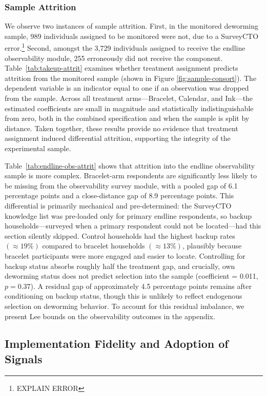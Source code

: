 \documentclass[12pt,a4paper]{article}
\begin{document}
\subsubsection{Sample Attrition}
\label{sec:sample-attrit}
We observe two instances of sample attrition. First, in the monitored deworming sample, 989 individuals assigned to be monitored were not, due to a SurveyCTO error.\footnote{EXPLAIN ERROR} Second, amongst the 3,729 individuals assigned to receive the endline observability module, 255 erroneously did not receive the component. Table~\ref{tab:takeup-attrit} examines whether treatment assignment predicts attrition from the monitored sample (shown in Figure \ref{fig:sample-consort}). The dependent variable is an indicator equal to one if an observation was dropped from the sample. Across all treatment arms---Bracelet, Calendar, and Ink---the estimated coefficients are small in magnitude and statistically indistinguishable from zero, both in the combined specification and when the sample is split by distance. Taken together, these results provide no evidence that treatment assignment induced differential attrition, supporting the integrity of the experimental sample.

Table~\ref{tab:endline-obs-attrit} shows that attrition into the endline observability sample is more complex. Bracelet-arm respondents are significantly less likely to be missing from the observability survey module, with a pooled gap of 6.1 percentage points and a close-distance gap of 8.9 percentage points. This differential is primarily mechanical and pre-determined: the SurveyCTO knowledge list was pre-loaded only for primary endline respondents, so backup households---surveyed when a primary respondent could not be located---had this section silently skipped. Control households had the highest backup rates $(\approx19\%)$ compared to bracelet households $(\approx13\%)$, plausibly because bracelet participants were more engaged and easier to locate. Controlling for backup status absorbs roughly half the treatment gap, and crucially, own deworming status does not predict selection into the sample (coefficient = 0.011, $p = 0.37$). A residual gap of approximately 4.5 percentage points remains after conditioning on backup status, though this is unlikely to reflect endogenous selection on deworming behavior. To account for this residual imbalance, we present Lee bounds on the observability outcomes in the appendix.

\subsection{Implementation Fidelity and Adoption of Signals} %
\end{document}
